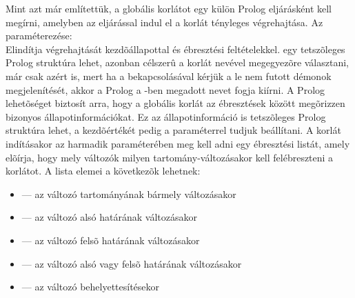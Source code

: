Mint azt már említettük, a globális korlátot egy külön Prolog eljárásként
kell megírni, amelyben az  eljárással indul el a korlát
tényleges végrehajtása. Az  paraméterezése:
\br
{}\\
Elindítja  végrehajtását  kezdõállapottal és
 ébresztési feltételekkel.  egy tetszõleges Prolog
struktúra lehet, azonban célszerû a korlát nevével megegyezõre választani,
már csak azért is, mert ha a  bekapcsolásával kérjük
a le nem futott démonok megjelenítését, akkor a Prolog a -ben
megadott nevet fogja kiírni.
\br
A Prolog lehetõséget biztosít arra, hogy a globális korlát az ébresztések
között megõrizzen bizonyos állapotinformációkat. Ez az állapotinformáció
is tetszõleges Prolog struktúra lehet, a kezdõértékét pedig a 
paraméterrel tudjuk beállítani.
\br
A korlát indításakor az  harmadik paraméterében
meg kell adni egy ébresztési listát, amely elõírja, hogy mely változók
milyen tartomány-változásakor kell felébreszteni a korlátot. A lista elemei
a következõk lehetnek:
\begin{itemize}
\item {} --- az  változó tartományának bármely
változásakor
\item {} --- az  változó alsó határának változásakor
\item {} --- az  változó felsõ határának változásakor
\item {} --- az  változó alsó vagy felsõ határának
változásakor
\item {} --- az  változó behelyettesítésekor
\end{itemize}

